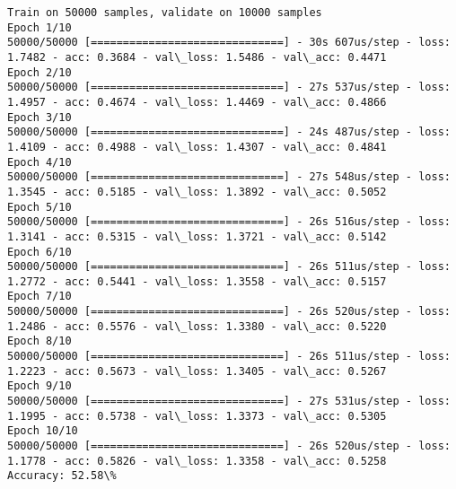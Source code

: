 \documentclass[11pt]{article}
\begin{document}
    \begin{Verbatim}[commandchars=\\\{\}]
Train on 50000 samples, validate on 10000 samples
Epoch 1/10
50000/50000 [==============================] - 30s 607us/step - loss: 1.7482 - acc: 0.3684 - val\_loss: 1.5486 - val\_acc: 0.4471
Epoch 2/10
50000/50000 [==============================] - 27s 537us/step - loss: 1.4957 - acc: 0.4674 - val\_loss: 1.4469 - val\_acc: 0.4866
Epoch 3/10
50000/50000 [==============================] - 24s 487us/step - loss: 1.4109 - acc: 0.4988 - val\_loss: 1.4307 - val\_acc: 0.4841
Epoch 4/10
50000/50000 [==============================] - 27s 548us/step - loss: 1.3545 - acc: 0.5185 - val\_loss: 1.3892 - val\_acc: 0.5052
Epoch 5/10
50000/50000 [==============================] - 26s 516us/step - loss: 1.3141 - acc: 0.5315 - val\_loss: 1.3721 - val\_acc: 0.5142
Epoch 6/10
50000/50000 [==============================] - 26s 511us/step - loss: 1.2772 - acc: 0.5441 - val\_loss: 1.3558 - val\_acc: 0.5157
Epoch 7/10
50000/50000 [==============================] - 26s 520us/step - loss: 1.2486 - acc: 0.5576 - val\_loss: 1.3380 - val\_acc: 0.5220
Epoch 8/10
50000/50000 [==============================] - 26s 511us/step - loss: 1.2223 - acc: 0.5673 - val\_loss: 1.3405 - val\_acc: 0.5267
Epoch 9/10
50000/50000 [==============================] - 27s 531us/step - loss: 1.1995 - acc: 0.5738 - val\_loss: 1.3373 - val\_acc: 0.5305
Epoch 10/10
50000/50000 [==============================] - 26s 520us/step - loss: 1.1778 - acc: 0.5826 - val\_loss: 1.3358 - val\_acc: 0.5258
Accuracy: 52.58\%

    \end{Verbatim}


    
    
    
    
\end{document}
